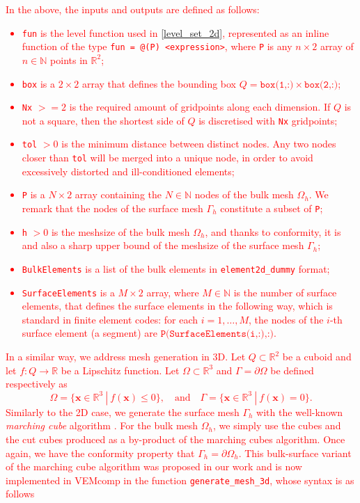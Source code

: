 \documentclass[a4paper]{article}
\newcommand{\boldx}{\boldsymbol{x}}
\newcommand{\red}[1]{\textcolor{red}{#1}}
\begin{document}
\red{
In the above, the inputs and outputs are defined as follows:
\begin{itemize}
\item \texttt{fun} is the level function used in \eqref{level_set_2d}, represented as an inline function of the type \texttt{fun = @(P) <expression>}, where \texttt{P} is any $n\times 2$ array of $n\in\mathbb{N}$ points in $\mathbb{R}^2$;
\item \texttt{box} is a $2\times 2$ array that defines the bounding box $Q = \texttt{box(1,:)} \times \texttt{box(2,:)}$;
\item \texttt{Nx} $>= 2$ is the required amount of gridpoints along each dimension.  If $Q$ is not a square, then the shortest side of $Q$ is discretised with \texttt{Nx} gridpoints;
\item \texttt{tol} $>0$ is the minimum distance between distinct nodes.  Any two nodes closer than \texttt{tol} will be merged into a unique node, in order to avoid excessively distorted and ill-conditioned elements;
\item \texttt{P} is a $N\times 2$ array containing the $N\in\mathbb{N}$ nodes of the bulk mesh $\Omega_h$. We remark that the nodes of the surface mesh $\Gamma_h$ constitute a subset of \texttt{P};
\item \texttt{h} $>0$ is the meshsize of the bulk mesh $\Omega_h$, and thanks to conformity, it is and also a sharp upper bound of the meshsize of the surface mesh $\Gamma_h$;
\item \texttt{BulkElements} is a list of the bulk elements in \texttt{element2d\_dummy} format;
\item \texttt{SurfaceElements} is a $M\times 2$ array, where $M\in\mathbb{N}$ is the number of surface elements, that defines the surface elements in the following way, which is standard in finite element codes: for each $i=1,\dots,M$, the nodes of the $i$-th surface element (a segment) are $\texttt{P(SurfaceElements(i,:),:)}$.
\end{itemize}}
\red{
In a similar way, we address mesh generation in 3D. Let $Q \subset\mathbb{R}^2$ be a cuboid and let $f: Q \rightarrow\mathbb{R}$ be a Lipschitz function.  Let $\Omega \subset\mathbb{R}^3$ and $\Gamma = \partial \Omega$ be defined respectively as
\begin{equation}
\label{level_set_3d}
\Omega = \{\boldx\in\mathbb{R}^3\ |\ f(\boldx) \le 0\}, \quad \text{and}\quad \Gamma = \{\boldx\in\mathbb{R}^3\ |\ f(\boldx) = 0\}.
\end{equation}
Similarly to the 2D case,  we generate the surface mesh $\Gamma_h$ with the well-known \emph{marching cube} algorithm \cite{lorensen1987marching}.  For the bulk mesh $\Omega_h$, we simply use the cubes and the cut cubes produced as a by-product of the marching cubes algorithm.  Once again, we have the conformity property that $\Gamma_h = \partial \Omega_h$.  This bulk-surface variant of the marching cube algorithm was proposed in our work \cite{frittelli2023elliptic} and is now implemented in VEMcomp in the function \texttt{generate\_mesh\_3d}, whose syntax is as follows}
\end{document}
